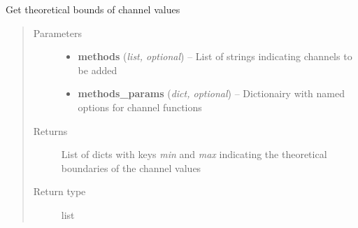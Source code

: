 \documentclass[letterpaper,10pt,english]{sphinxmanual}
\begin{document}

\begin{fulllineitems}
\label{classification:flamingo.classification.channels.get_channel_bounds}
Get theoretical bounds of channel values
\begin{quote}\begin{description}
\item[{Parameters}] \leavevmode\begin{itemize}
\item {} 
\textbf{methods} (\emph{list, optional}) -- List of strings indicating channels to be added

\item {} 
\textbf{methods\_params} (\emph{dict, optional}) -- Dictionairy with named options for channel functions

\end{itemize}

\item[{Returns}] \leavevmode
List of dicts with keys \emph{min} and \emph{max} indicating the
theoretical boundaries of the channel values

\item[{Return type}] \leavevmode
list

\end{description}\end{quote}

\end{fulllineitems}

\end{document}
